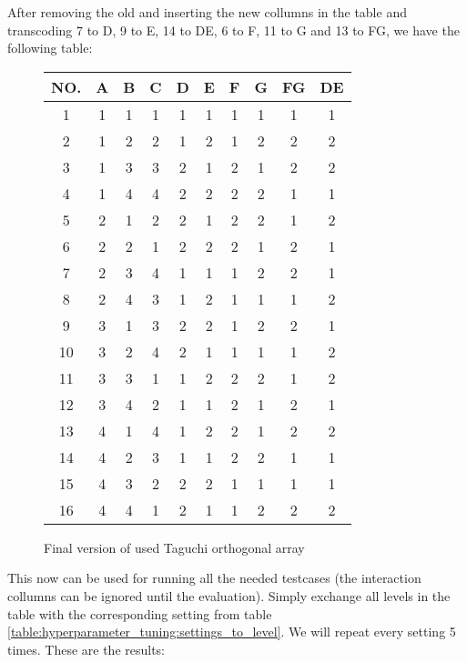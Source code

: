 After removing the old and inserting the new collumns in the table and transcoding 7 to D, 9 to E, 14 to DE, 6 to F, 11 to G and 13 to FG, we have the following table:

\begin{figure}[!h]
	\centering
	\begin{tabular}{ |c||c|c|c|c|c|c|c|c|c|  }
		\hline
		NO.& A & B & C & D & E & F & G & FG& DE\\
		\hline
		1  & 1 & 1 & 1 & 1 & 1 & 1 & 1 & 1 & 1\\
		2  & 1 & 2 & 2 & 1 & 2 & 1 & 2 & 2 & 2\\
		3  & 1 & 3 & 3 & 2 & 1 & 2 & 1 & 2 & 2\\
		4  & 1 & 4 & 4 & 2 & 2 & 2 & 2 & 1 & 1\\
		5  & 2 & 1 & 2 & 2 & 1 & 2 & 2 & 1 & 2\\
		6  & 2 & 2 & 1 & 2 & 2 & 2 & 1 & 2 & 1\\
		7  & 2 & 3 & 4 & 1 & 1 & 1 & 2 & 2 & 1\\
		8  & 2 & 4 & 3 & 1 & 2 & 1 & 1 & 1 & 2\\
		9  & 3 & 1 & 3 & 2 & 2 & 1 & 2 & 2 & 1\\
		10 & 3 & 2 & 4 & 2 & 1 & 1 & 1 & 1 & 2\\
		11 & 3 & 3 & 1 & 1 & 2 & 2 & 2 & 1 & 2\\
		12 & 3 & 4 & 2 & 1 & 1 & 2 & 1 & 2 & 1\\
		13 & 4 & 1 & 4 & 1 & 2 & 2 & 1 & 2 & 2\\
		14 & 4 & 2 & 3 & 1 & 1 & 2 & 2 & 1 & 1\\
		15 & 4 & 3 & 2 & 2 & 2 & 1 & 1 & 1 & 1\\
		16 & 4 & 4 & 1 & 2 & 1 & 1 & 2 & 2 & 2\\
		\hline
	\end{tabular}
	\caption{Final version of used Taguchi orthogonal array}
\end{figure}


This now can be used for running all the needed testcases (the interaction collumns can be ignored until the evaluation). Simply exchange all levels in the table with the corresponding setting from table \ref{table:hyperparameter_tuning:settings_to_level}. We will repeat every setting 5 times. These are the results:


